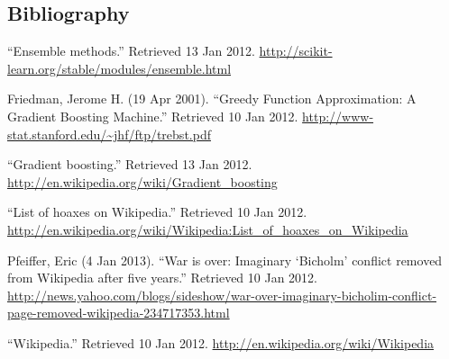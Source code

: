 \documentclass[10pt]{article}
\begin{document}
    \subsection{Bibliography}
    
    \begingroup
    \renewcommand{\section}[2]{}  %
    \begin{thebibliography}{1}
        
         ``Ensemble methods.'' Retrieved 13 Jan 2012. \url{http://scikit-learn.org/stable/modules/ensemble.html}
                
         Friedman, Jerome H. (19 Apr 2001). ``Greedy Function Approximation: A Gradient Boosting Machine.'' Retrieved 10 Jan 2012. \url{http://www-stat.stanford.edu/~jhf/ftp/trebst.pdf}
        
         ``Gradient boosting.'' Retrieved 13 Jan 2012. \url{http://en.wikipedia.org/wiki/Gradient_boosting}

         ``List of hoaxes on Wikipedia.'' Retrieved 10 Jan 2012. \url{http://en.wikipedia.org/wiki/Wikipedia:List_of_hoaxes_on_Wikipedia}
        
         Pfeiffer, Eric (4 Jan 2013). ``War is over: Imaginary `Bicholm' conflict removed from Wikipedia after five years.'' Retrieved 10 Jan 2012. \url{http://news.yahoo.com/blogs/sideshow/war-over-imaginary-bicholim-conflict-page-removed-wikipedia-234717353.html}
        
         ``Wikipedia.'' Retrieved 10 Jan 2012. \url{http://en.wikipedia.org/wiki/Wikipedia}
        
    \end{thebibliography}
    \endgroup
    
    \newpage
    
\end{document}
